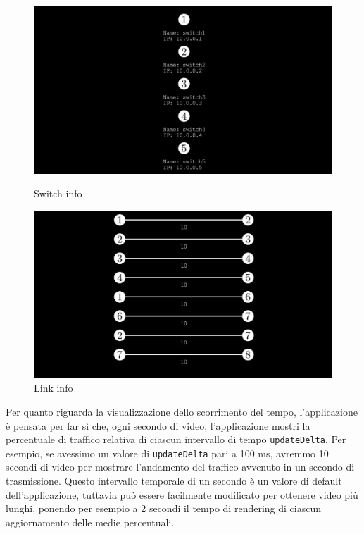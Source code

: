 \documentclass[binding=0.6cm]{sapthesis}
\begin{document}
\begin{figure}[ht]
    \centering
    \begin{minipage}{0.48\textwidth}
      \includegraphics[width=\linewidth]{immagini/switch_info.JPG}
      \caption{Switch info}
      \label{fig:switch_info}
    \end{minipage}\hfill
    \begin{minipage}{0.48\textwidth}
      \includegraphics[width=\linewidth]{immagini/links_info.JPG}
      \caption{Link info}
      \label{fig:links_info}
    \end{minipage}
\end{figure}

Per quanto riguarda la visualizzazione dello scorrimento del tempo, l'applicazione è pensata per far sì che, ogni secondo di video, 
l'applicazione mostri la percentuale di traffico relativa di ciascun
intervallo di tempo \texttt{updateDelta}. Per esempio, se avessimo un valore di \texttt{updateDelta} pari a 100 ms, avremmo 10 secondi di video per mostrare
l'andamento del traffico avvenuto in un secondo di trasmissione. Questo intervallo temporale di un secondo è un valore di default dell'applicazione, tuttavia
può essere facilmente modificato per ottenere video più lunghi, ponendo per esempio a 2 secondi il tempo di rendering di ciascun aggiornamento delle medie percentuali.
\end{document}
